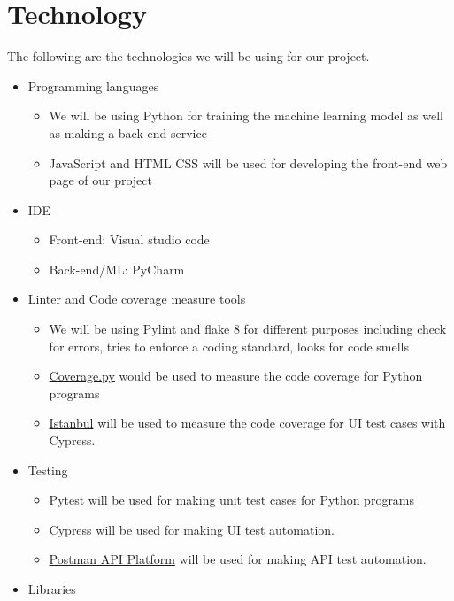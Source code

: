 \documentclass[12pt,letterpaper]{article}
\begin{document}
\section{Technology}
The following are the technologies we will be using for our project.
\begin{itemize}
    \item Programming languages
    \begin{itemize}
        \item We will be using Python for training the machine learning model as
        well as making a back-end service 
        \item JavaScript and HTML CSS will be used for developing the front-end
        web page of our project
    \end{itemize}
    \item IDE
    \begin{itemize}
        \item Front-end: Visual studio code
        \item Back-end/ML: PyCharm
    \end{itemize}
    \item Linter and Code coverage measure tools
    \begin{itemize}
        \item We will be using Pylint and flake 8 for different purposes
        including check for errors, tries to enforce a coding standard, looks
        for code smells
        \item \href{https://coverage.readthedocs.io/en/6.5.0/}{Coverage.py}
        would be used to measure the code coverage for Python programs
        \item \href{https://istanbul.js.org/}{Istanbul} will be used to measure
        the code coverage for UI test cases with Cypress.
    \end{itemize}
    \item Testing
    \begin{itemize}
        \item Pytest will be used for making unit test cases for Python programs
        \item \href{https://www.cypress.io/}{Cypress} will be used for making UI
        test automation.
        \item \href{https://www.postman.com/}{Postman API Platform} will be used
        for making API test automation.
    \end{itemize}
    \item Libraries
    \begin{itemize}

\end{itemize}
\end{itemize}
\end{document}
